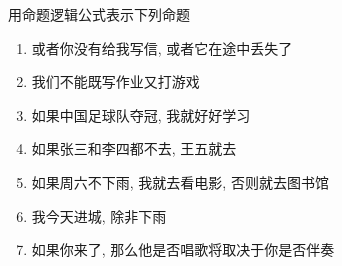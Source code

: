 \begin{frame}{}
  \begin{exampleblock}{用命题逻辑公式表示下列命题}
    \begin{enumerate}[<+->][(1)]
      \setlength{\itemsep}{8pt}
      \item 或者你没有给我写信, 或者它在途中丢失了
      \item 我们不能既写作业又打游戏
      \item 如果中国足球队夺冠, 我就好好学习
      \item 如果张三和李四都不去, 王五就去
      \item 如果周六不下雨, 我就去看电影, 否则就去图书馆
      \item 我今天进城, 除非下雨
      \item 如果你来了, 那么他是否唱歌将取决于你是否伴奏
    \end{enumerate}
  \end{exampleblock}
\end{frame}

%
